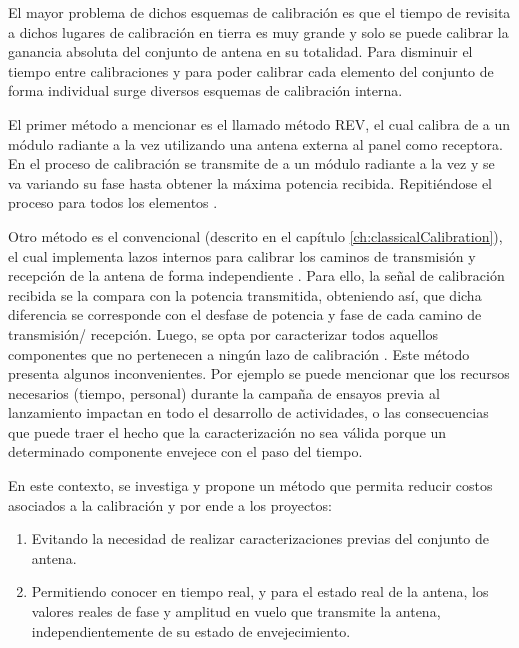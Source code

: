 El mayor problema de dichos esquemas de calibración es que el tiempo de revisita a dichos lugares de calibración en tierra es muy
grande y solo se puede calibrar la ganancia absoluta del conjunto de antena en su totalidad. Para disminuir el tiempo entre
calibraciones y para poder calibrar cada elemento del conjunto de forma individual surge diversos esquemas de calibración
interna.

El primer método a mencionar es el llamado método REV, el cual calibra de a un módulo radiante a la vez utilizando una antena
externa al panel como receptora. En el proceso de calibración se transmite de a un módulo radiante a la vez y se va variando su
fase hasta obtener la máxima potencia recibida. Repitiéndose el proceso para todos los elementos \cite{Chiba1999}
\cite{Makino2006}\cite{Hara1997}.

Otro método es el convencional (descrito en el capítulo \ref{ch:classicalCalibration}), el cual implementa lazos internos
para calibrar los caminos de transmisión y recepción de la antena de forma independiente \cite{Makhoul2012}
\cite{Luscombe1990}\cite{Seifert1996}\cite{Dall1994}\cite{Freeman1995}\cite{Bibby2003}\cite{Bast2003}\cite{Stove2004}
\cite{Srivastava1996}\cite{Wang2010}. Para ello, la señal de calibración recibida se la compara con la potencia transmitida,
obteniendo así, que dicha diferencia se corresponde con el desfase de potencia y fase de cada camino de transmisión/
recepción. Luego, se opta por caracterizar todos aquellos componentes que no pertenecen a ningún lazo de calibración
\cite{Freeman1995}. Este método presenta algunos inconvenientes. Por ejemplo se puede mencionar que los recursos necesarios
(tiempo, personal) durante la campaña de ensayos previa al lanzamiento impactan en todo el desarrollo de actividades,
o las consecuencias que puede traer el hecho que la caracterización no sea válida porque un determinado componente
envejece con el paso del tiempo.

En este contexto, se investiga y propone un método que permita reducir costos asociados a la calibración y por ende a los
proyectos:

\begin{enumerate}
    \item Evitando la necesidad de realizar caracterizaciones previas del conjunto de antena.
    \item Permitiendo conocer en tiempo real, y para el estado real de la antena, los valores reales de fase y amplitud en
		vuelo que transmite la antena, independientemente de su estado de envejecimiento.
\end{enumerate}

